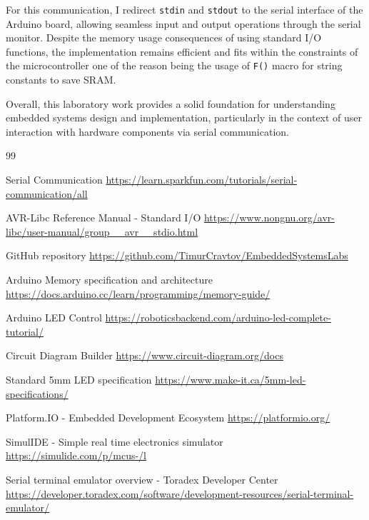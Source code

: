 For this communication, I redirect \texttt{stdin} and \texttt{stdout} to the serial interface of the Arduino board, allowing seamless input and output operations through the serial monitor. Despite the memory usage consequences of using standard I/O functions, the implementation remains efficient and fits within the constraints of the microcontroller one of the reason being the usage of \texttt{F()} macro for string constants to save SRAM. 

Overall, this laboratory work provides a solid foundation for understanding embedded systems design and implementation, particularly in the context of user interaction with hardware components via serial communication.  


\begin{thebibliography}{99}

 Serial Communication \url{https://learn.sparkfun.com/tutorials/serial-communication/all}

 AVR-Libc Reference Manual - Standard I/O \url{https://www.nongnu.org/avr-libc/user-manual/group__avr__stdio.html}

 GitHub repository \url{https://github.com/TimurCravtov/EmbeddedSystemsLabs}

 Arduino Memory specification and architecture \url{https://docs.arduino.cc/learn/programming/memory-guide/}

 Arduino LED Control \url{https://roboticsbackend.com/arduino-led-complete-tutorial/}

 Circuit Diagram Builder \url{https://www.circuit-diagram.org/docs}

 Standard 5mm LED specification \url{https://www.make-it.ca/5mm-led-specifications/}

 Platform.IO - Embedded Development Ecosystem \url{https://platformio.org/}

 SimulIDE - Simple real time electronics simulator \url{https://simulide.com/p/mcus-/l}

 Serial terminal emulator overview - Toradex Developer Center \url{https://developer.toradex.com/software/development-resources/serial-terminal-emulator/}

\end{thebibliography}

